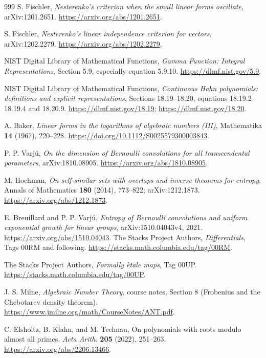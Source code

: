 \documentclass[11pt,a4paper]{article}
\theoremstyle{definition}
\theoremstyle{remark}
\numberwithin{equation}{section}
\begin{document}
\begin{thebibliography}{999}
S. Fischler, \emph{Nesterenko's criterion when the small linear forms oscillate}, arXiv:1201.2651.
\url{https://arxiv.org/abs/1201.2651}.

S. Fischler, \emph{Nesterenko's linear independence criterion for vectors}, arXiv:1202.2279.
\url{https://arxiv.org/abs/1202.2279}.

NIST Digital Library of Mathematical Functions, \emph{Gamma Function: Integral Representations}, Section 5.9, especially equation 5.9.10.
\url{https://dlmf.nist.gov/5.9}.

NIST Digital Library of Mathematical Functions, \emph{Continuous Hahn polynomials: definitions and explicit representations}, Sections 18.19--18.20, equations 18.19.2--18.19.4 and 18.20.9.
\url{https://dlmf.nist.gov/18.19}; \url{https://dlmf.nist.gov/18.20}.

A. Baker, \emph{Linear forms in the logarithms of algebraic numbers (III)}, Mathematika \textbf{14} (1967), 220--228.
\url{https://doi.org/10.1112/S0025579300003843}.

P. P. Varj\'u, \emph{On the dimension of Bernoulli convolutions for all transcendental parameters}, arXiv:1810.08905.
\url{https://arxiv.org/abs/1810.08905}.

M. Hochman, \emph{On self-similar sets with overlaps and inverse theorems for entropy}, Annals of Mathematics \textbf{180} (2014), 773--822; arXiv:1212.1873.
\url{https://arxiv.org/abs/1212.1873}.

E. Breuillard and P. P. Varj\'u, \emph{Entropy of Bernoulli convolutions and uniform exponential growth for linear groups}, arXiv:1510.04043v4, 2021.
\url{https://arxiv.org/abs/1510.04043}.
The Stacks Project Authors, \emph{Differentials}, Tags 00RM and following.
\url{https://stacks.math.columbia.edu/tag/00RM}.

The Stacks Project Authors, \emph{Formally \`etale maps}, Tag 00UP.
\url{https://stacks.math.columbia.edu/tag/00UP}.

J. S. Milne, \emph{Algebraic Number Theory}, course notes,
Section 8 (Frobenius and the Chebotarev density theorem).
\url{https://www.jmilne.org/math/CourseNotes/ANT.pdf}.

C. Elsholtz, B. Klahn, and M. Technau, On polynomials with roots modulo
almost all primes, \emph{Acta Arith.} \textbf{205} (2022), 251--263.
\url{https://arxiv.org/abs/2206.13466}.


\end{thebibliography}
\end{document}
